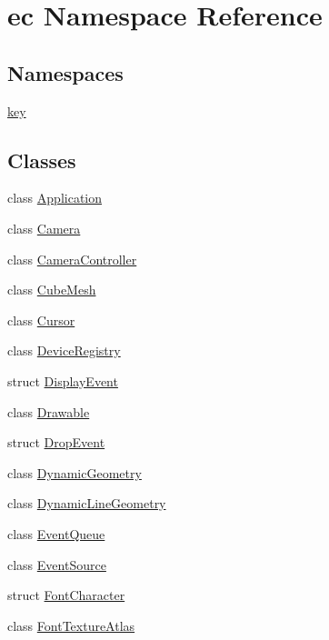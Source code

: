 \hypertarget{namespaceec}{}\section{ec Namespace Reference}
\label{namespaceec}
\subsection*{Namespaces}
\begin{DoxyCompactItemize}
\item 
 \mbox{\hyperlink{namespaceec_1_1key}{key}}
\end{DoxyCompactItemize}
\subsection*{Classes}
\begin{DoxyCompactItemize}
\item 
class \mbox{\hyperlink{classec_1_1_application}{Application}}
\item 
class \mbox{\hyperlink{classec_1_1_camera}{Camera}}
\item 
class \mbox{\hyperlink{classec_1_1_camera_controller}{Camera\+Controller}}
\item 
class \mbox{\hyperlink{classec_1_1_cube_mesh}{Cube\+Mesh}}
\item 
class \mbox{\hyperlink{classec_1_1_cursor}{Cursor}}
\item 
class \mbox{\hyperlink{classec_1_1_device_registry}{Device\+Registry}}
\item 
struct \mbox{\hyperlink{structec_1_1_display_event}{Display\+Event}}
\item 
class \mbox{\hyperlink{classec_1_1_drawable}{Drawable}}
\item 
struct \mbox{\hyperlink{structec_1_1_drop_event}{Drop\+Event}}
\item 
class \mbox{\hyperlink{classec_1_1_dynamic_geometry}{Dynamic\+Geometry}}
\item 
class \mbox{\hyperlink{classec_1_1_dynamic_line_geometry}{Dynamic\+Line\+Geometry}}
\item 
class \mbox{\hyperlink{classec_1_1_event_queue}{Event\+Queue}}
\item 
class \mbox{\hyperlink{classec_1_1_event_source}{Event\+Source}}
\item 
struct \mbox{\hyperlink{structec_1_1_font_character}{Font\+Character}}
\item 
class \mbox{\hyperlink{classec_1_1_font_texture_atlas}{Font\+Texture\+Atlas}}

\end{DoxyCompactItemize}
